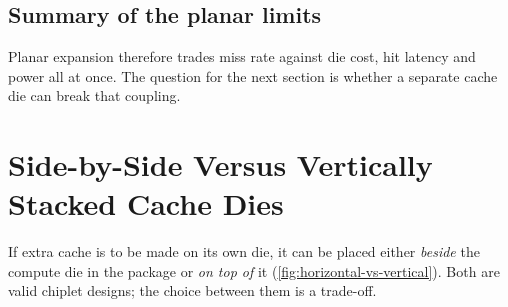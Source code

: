 \subsection{Summary of the planar limits}
Planar expansion therefore trades miss rate against die cost, hit latency and power all at once. The question for the next section is whether a separate cache die can break that coupling.

\section{Side-by-Side Versus Vertically Stacked Cache Dies}
\label{sec:horizontal-vs-vertical}

If extra cache is to be made on its own die, it can be placed either \emph{beside} the compute die in the package or \emph{on top of} it (\cref{fig:horizontal-vs-vertical}). Both are valid chiplet designs; the choice between them is a trade-off.

